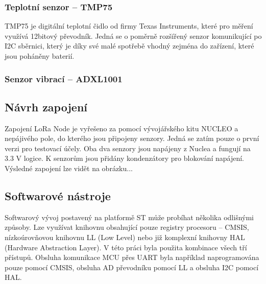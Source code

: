     




\subsubsection{Teplotní senzor – TMP75}

    TMP75 je digitální teplotní čidlo od firmy Texas Instruments, které pro měření využívá 12bitový převodník. Jedná se o poměrně rozšířený senzor komunikující po I2C sběrnici, který je díky své malé spotřebě vhodný zejména do zařízení, které jsou poháněny baterií.
    

\subsubsection{Senzor vibrací – ADXL1001}

    




\subsection{Návrh zapojení}

    Zapojení LoRa Node je vyřešeno za pomocí vývojářského kitu NUCLEO a nepájivého pole, do kterého jsou připojeny senzory. Jedná se zatím pouze o první verzi pro testovací účely. Oba dva senzory jsou napájeny z Nuclea a fungují na 3.3 V logice. K senzorům jsou přidány kondenzátory pro blokování napájení. Výsledné zapojení lze vidět na obrázku...
    
    


\subsection{Softwarové nástroje}

    Softwarový vývoj postavený na platformě ST může probíhat několika odlišnými způsoby. Lze využívat knihovnu obsahující pouze registry procesoru – CMSIS, nízkoúrovňovou knihovnu LL (Low Level) nebo již komplexní knihovny HAL (Hardware Abstraction Layer). V této práci byla použita kombinace všech tří přístupů. Obsluha komunikace MCU přes UART byla například naprogramována pouze pomocí CMSIS, obsluha AD převodníku pomocí LL a obsluha I2C pomocí HAL.
    
